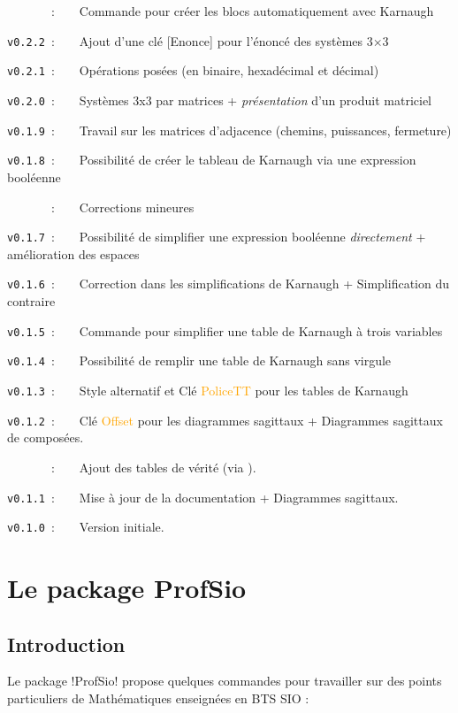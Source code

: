 \documentclass[french,a4paper,11pt]{article}
\newcommand\Cle[1]{{\small\sffamily\textlangle \textcolor{orange}{#1}\textrangle}}
\begin{document}
{{\verb|      |~:~~~~Commande pour créer les blocs automatiquement avec Karnaugh

\verb|v0.2.2|~:~~~~Ajout d'une clé \textsf{[Enonce]} pour l'énoncé des systèmes 3×3

\verb|v0.2.1|~:~~~~Opérations posées (en binaire, hexadécimal et décimal)

\verb|v0.2.0|~:~~~~Systèmes 3x3 par matrices + \textit{présentation} d'un produit matriciel

\verb|v0.1.9|~:~~~~Travail sur les matrices d'adjacence (chemins, puissances, fermeture)

\verb|v0.1.8|~:~~~~Possibilité de créer le tableau de Karnaugh via une expression booléenne

\verb|      |~:~~~~Corrections mineures

\verb|v0.1.7|~:~~~~Possibilité de simplifier une expression booléenne \textit{directement} + amélioration des espaces

\verb|v0.1.6|~:~~~~Correction dans les simplifications de Karnaugh + Simplification du contraire

\verb|v0.1.5|~:~~~~Commande pour simplifier une table de Karnaugh à trois variables

\verb|v0.1.4|~:~~~~Possibilité de remplir une table de Karnaugh sans virgule

\verb|v0.1.3|~:~~~~Style alternatif et Clé \Cle{PoliceTT} pour les tables de Karnaugh

\verb|v0.1.2|~:~~~~Clé \Cle{Offset} pour les diagrammes sagittaux + Diagrammes sagittaux de composées.

\verb|      |~:~~~~Ajout des tables de vérité (via ).

\verb|v0.1.1|~:~~~~Mise à jour de la documentation + Diagrammes sagittaux.

\verb|v0.1.0|~:~~~~Version initiale.

\newpage

\section{Le package ProfSio}

\subsection{Introduction}

\begin{noteblock}
Le package \packagetex!ProfSio! propose quelques commandes pour travailler sur des points particuliers de Mathématiques enseignées en BTS SIO :


\end{noteblock}}}
\end{document}
